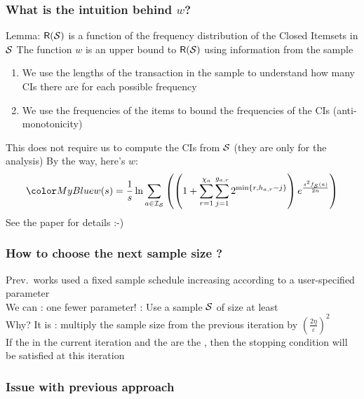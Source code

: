 \begin{frame}
  \frametitle{What is the intuition behind $w$?}
  Lemma: $\mathsf{R}({\cal S})$ is a function of the frequency distribution of the
  Closed Itemsets in ${\cal S}$
  \vfill
  The function $w$ is an upper bound to $\mathsf{R}({\cal S})$ using information from the sample
  \begin{enumerate}
    \item We use the lengths of the transaction in the sample to understand
      how many CIs there are for each possible frequency
    \item We use the frequencies of the items to bound the frequencies of
      the CIs (anti-monotonicity)
  \end{enumerate}
  This does not require us to compute the CIs from ${\cal S}$ (they are only for the
  analysis)
  \vfill
  \pause
  By the way, here's $w$:
  \[
    \inblue{
    w(s) =
    \frac{1}{s}\ln\displaystyle\sum_{a\in\mathcal{I}_\Sam}\left(\left(1+\displaystyle\sum_{r=1}^{\chi_a}\displaystyle\sum_{j=1}^{g_{a,r}}2^{\min\{r,h_{a,r}-j\}}\right)e^{\frac{s^2f_\Sam(a)}{2n}}\right)
    }
  \]
  See the paper for details :-)
\end{frame}

\begin{frame}
  \frametitle{How to choose the next sample size ?}
  Prev.~works used a fixed sample schedule increasing according to a user-specified parameter\\
  \quad We can : one fewer parameter!
  \vfill
  : Use a sample ${\cal S}$ of size at least
  \\
  \quad Why? It is 
  \vfill
  : multiply the sample size from the previous
  iteration by $\displaystyle\left(\frac{2\eta}{\varepsilon}\right)^2$\\
   If the  in the current iteration
  and the  are the , then the stopping condition will be satisfied at this iteration
\end{frame}


\begin{frame}
  \frametitle{Issue with previous approach}
\end{frame}

